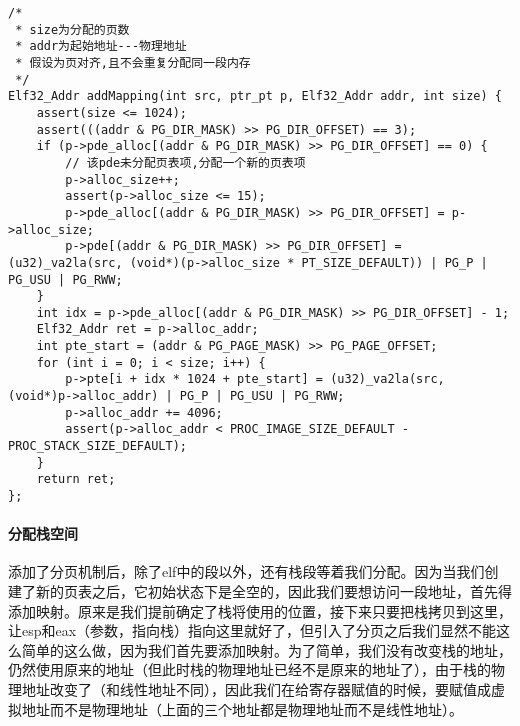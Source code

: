 \documentclass{whureport}
\begin{document}
\begin{lstlisting}
/*
 * size为分配的页数
 * addr为起始地址---物理地址
 * 假设为页对齐,且不会重复分配同一段内存
 */
Elf32_Addr addMapping(int src, ptr_pt p, Elf32_Addr addr, int size) {
    assert(size <= 1024);
    assert(((addr & PG_DIR_MASK) >> PG_DIR_OFFSET) == 3);
    if (p->pde_alloc[(addr & PG_DIR_MASK) >> PG_DIR_OFFSET] == 0) {
        // 该pde未分配页表项,分配一个新的页表项
        p->alloc_size++;
        assert(p->alloc_size <= 15);
        p->pde_alloc[(addr & PG_DIR_MASK) >> PG_DIR_OFFSET] = p->alloc_size;
        p->pde[(addr & PG_DIR_MASK) >> PG_DIR_OFFSET] = (u32)_va2la(src, (void*)(p->alloc_size * PT_SIZE_DEFAULT)) | PG_P | PG_USU | PG_RWW;
    }
    int idx = p->pde_alloc[(addr & PG_DIR_MASK) >> PG_DIR_OFFSET] - 1;
    Elf32_Addr ret = p->alloc_addr;
    int pte_start = (addr & PG_PAGE_MASK) >> PG_PAGE_OFFSET;
    for (int i = 0; i < size; i++) {
        p->pte[i + idx * 1024 + pte_start] = (u32)_va2la(src, (void*)p->alloc_addr) | PG_P | PG_USU | PG_RWW;
        p->alloc_addr += 4096;
        assert(p->alloc_addr < PROC_IMAGE_SIZE_DEFAULT - PROC_STACK_SIZE_DEFAULT);
    }
    return ret;
};
\end{lstlisting}


\paragraph{分配栈空间} 添加了分页机制后，除了elf中的段以外，还有栈段等着我们分配。因为当我们创建了新的页表之后，它初始状态下是全空的，因此我们要想访问一段地址，首先得添加映射。原来是我们提前确定了栈将使用的位置，接下来只要把栈拷贝到这里，让esp和eax（参数，指向栈）指向这里就好了，但引入了分页之后我们显然不能这么简单的这么做，因为我们首先要添加映射。为了简单，我们没有改变栈的地址，仍然使用原来的地址（但此时栈的物理地址已经不是原来的地址了），由于栈的物理地址改变了（和线性地址不同），因此我们在给寄存器赋值的时候，要赋值成虚拟地址而不是物理地址（上面的三个地址都是物理地址而不是线性地址）。
\end{document}
